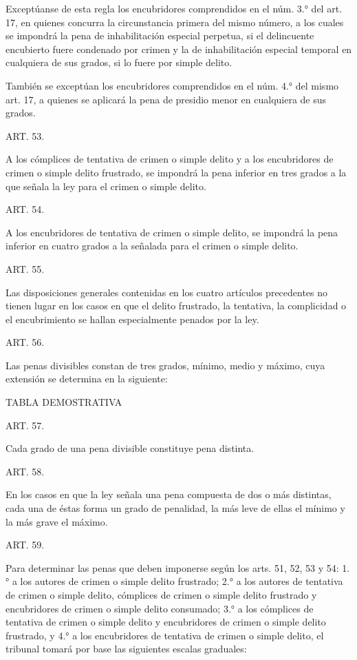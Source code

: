     Exceptúanse de esta regla los encubridores comprendidos en el núm. 3.° del art. 17, en quienes concurra la circunstancia primera del mismo número, a los cuales se impondrá la pena de inhabilitación especial perpetua, si el delincuente encubierto fuere condenado por crimen y la de inhabilitación especial temporal en cualquiera de sus grados, si lo fuere por simple delito.

    También se exceptúan los encubridores comprendidos en el núm. 4.° del mismo art. 17, a quienes se aplicará la pena de presidio menor en cualquiera de sus grados.


    ART. 53.

    A los cómplices de tentativa de crimen o simple delito y a los encubridores de crimen o simple delito frustrado, se impondrá la pena inferior en tres grados a la que señala la ley para el crimen o simple delito.


    ART. 54.

    A los encubridores de tentativa de crimen o simple delito, se impondrá la pena inferior en cuatro grados a la señalada para el crimen o simple delito.


    ART. 55.

    Las disposiciones generales contenidas en los cuatro artículos precedentes no tienen lugar en los casos en que el delito frustrado, la tentativa, la complicidad o el encubrimiento se hallan especialmente penados por la ley.


    ART. 56.

    Las penas divisibles constan de tres grados, mínimo, medio y máximo, cuya extensión se determina en la siguiente:

    TABLA DEMOSTRATIVA

  



    ART. 57.

    Cada grado de una pena divisible constituye pena distinta.


    ART. 58.

    En los casos en que la ley señala una pena compuesta de dos o más distintas, cada una de éstas forma un grado de penalidad, la más leve de ellas el mínimo y la más grave el máximo.



    ART. 59.

    Para determinar las penas que deben imponerse según los arts. 51, 52, 53 y 54: 1.° a los autores de crimen o simple delito frustrado; 2.° a los autores de tentativa de crimen o simple delito, cómplices de crimen o simple delito frustrado y encubridores de crimen o simple delito consumado; 3.° a los cómplices de tentativa de crimen o simple delito y encubridores de crimen o simple delito frustrado, y 4.° a los encubridores de tentativa de crimen o simple delito, el tribunal tomará por base las siguientes escalas graduales:

